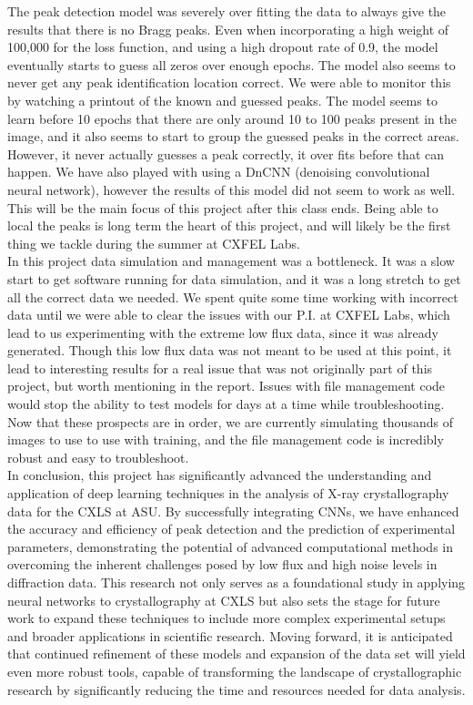 \documentclass[12pt]{article}
\begin{document}
The peak detection model was severely over fitting the data to always give the results that there is no Bragg peaks. Even when incorporating a high weight of 100,000 for the loss function, and using a high dropout rate of 0.9, the model eventually starts to guess all zeros over enough epochs. The model also seems to never get any peak identification location correct. We were able to monitor this by watching a printout of the known and guessed peaks. The model seems to learn before 10 epochs that there are only around 10 to 100 peaks present in the image, and it also seems to start to group the guessed peaks in the correct areas. However, it never actually guesses a peak correctly, it over fits before that can happen. We have also played with using a DnCNN (denoising convolutional neural network), however the results of this model did not seem to work as well. This will be the main focus of this project after this class ends. Being able to local the peaks is long term the heart of this project, and will likely be the first thing we tackle during the summer at CXFEL Labs.\\

In this project data simulation and management was a bottleneck. It was a slow start to get software running for data simulation, and it was a long stretch to get all the correct data we needed. We spent quite some time working with incorrect data until we were able to clear the issues with our P.I. at CXFEL Labs, which lead to us experimenting with the extreme low flux data, since it was already generated. Though this low flux data was not meant to be used at this point, it lead to interesting results for a real issue that was not originally part of this project, but worth mentioning in the report. Issues with file management code would stop the ability to test models for days at a time while troubleshooting. Now that these prospects are in order, we are currently simulating thousands of images to use to use with training, and the file management code is incredibly robust and easy to troubleshoot.\\

In conclusion, this project has significantly advanced the understanding and application of deep learning techniques in the analysis of X-ray crystallography data for the CXLS at ASU. By successfully integrating CNNs, we have enhanced the accuracy and efficiency of peak detection and the prediction of experimental parameters, demonstrating the potential of advanced computational methods in overcoming the inherent challenges posed by low flux and high noise levels in diffraction data. This research not only serves as a foundational study in applying neural networks to crystallography at CXLS but also sets the stage for future work to expand these techniques to include more complex experimental setups and broader applications in scientific research. Moving forward, it is anticipated that continued refinement of these models and expansion of the data set will yield even more robust tools, capable of transforming the landscape of crystallographic research by significantly reducing the time and resources needed for data analysis.\\

\end{document}
